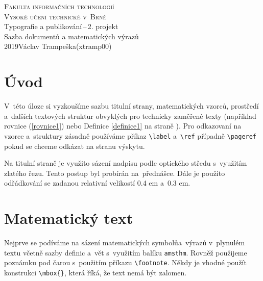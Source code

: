 \documentclass[a4paper, 11pt, twocolumn]{article}
\theoremstyle{definition}
\theoremstyle{definition}
\begin{document}
\begin{titlepage}
\begin{center}

{\Huge\textsc{Fakulta informačních technologií}\\
\vspace{0.4em}\textsc{Vysoké učení technické v~Brně}\\}
{\LARGE Typografie a publikování\,--\,2. projekt\\
\vspace{0.3em}Sazba dokumentů a matematických výrazů\\}
{\Large 2019\hfill Václav Trampeška(xtramp00)}
\end{center}
\end{titlepage}


\section*{Úvod}
V~této úloze si vyzkoušíme sazbu titulní strany, matematic\-kých vzorců, prostředí a~dalších textových struktur obvyklých pro technicky zaměřené texty (například rovnice (\ref{rovnice1}) nebo Definice \ref{definice1} na straně \pageref{definice1}). Pro odkazovaní na vzorce a~struktury zásadně používáme příkaz \verb|\label| a~\verb|\ref| případně \verb|\pageref| pokud se chceme odkázat na stranu výskytu.

Na titulní straně je využito sázení nadpisu podle optického středu s~využitím zlatého řezu. Tento postup byl probírán na~přednášce. Dále je použito odřádkování se zadanou relativní velikostí 0.4 em a~0.3 em.

\section{Matematický text}
Nejprve se podíváme na sázení matematických symbolů\linebreak a~výrazů v~plynulém textu včetně sazby definic a~vět s~využitím balíku \texttt{amsthm}. Rovněž použijeme poznámku pod čarou s~použitím příkazu \verb|\footnote|. Někdy je vhodné použít konstrukci \verb|\mbox{}|, která říká, že text nemá být zalomen.
\end{document}
